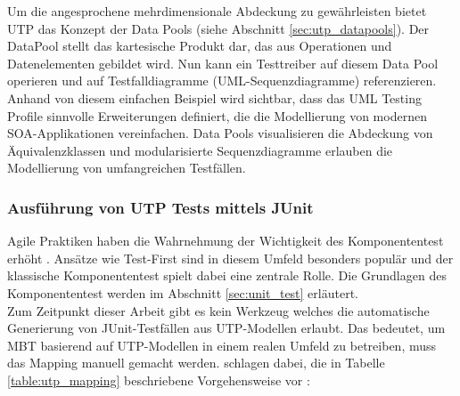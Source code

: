 Um die angesprochene mehrdimensionale Abdeckung zu gewährleisten bietet \Gls{UTP} das Konzept der Data Pools (siehe Abschnitt \ref{sec:utp_datapools}). Der DataPool stellt das kartesische Produkt dar, das aus Operationen und Datenelementen gebildet wird. Nun kann ein Testtreiber auf diesem Data Pool operieren und auf Testfalldiagramme (UML-Sequenzdiagramme) referenzieren.\\
Anhand von diesem einfachen Beispiel wird sichtbar, dass das \Gls{UML} Testing Profile sinnvolle Erweiterungen definiert, die die Modellierung von modernen SOA-Applikationen vereinfachen. Data Pools visualisieren die Abdeckung von Äquivalenzklassen und modularisierte Sequenzdiagramme erlauben die Modellierung von umfangreichen Testfällen. 

\subsubsection{Ausführung von UTP Tests mittels JUnit}
Agile Praktiken haben die Wahrnehmung der Wichtigkeit des Komponententest erhöht \cite{_model-driven_2007}. Ansätze wie \gls{Test-First} sind in diesem Umfeld besonders populär und der klassische Komponententest spielt dabei eine zentrale Rolle. Die Grundlagen des Komponententest werden im Abschnitt \ref{sec:unit_test} erläutert.\\

Zum Zeitpunkt dieser Arbeit gibt es kein Werkzeug welches die automatische Generierung von JUnit-Testfällen aus \Gls{UTP}-Modellen erlaubt. Das bedeutet, um \Gls{MBT} basierend auf \Gls{UTP}-Modellen in einem realen Umfeld zu betreiben, muss das Mapping manuell gemacht werden. \citeauthor{_model-driven_2007} schlagen dabei, die in Tabelle \ref{table:utp_mapping} beschriebene Vorgehensweise vor \cite{_model-driven_2007}:


